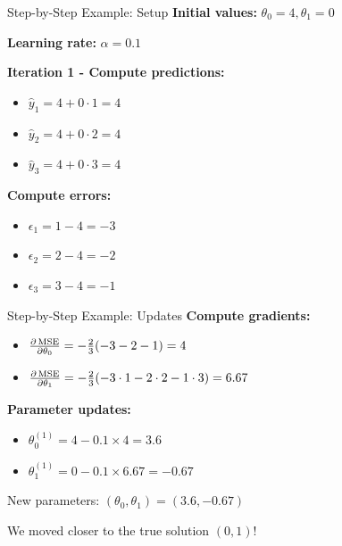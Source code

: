 \documentclass[usenames,dvipsnames]{beamer}
\begin{document}
  \begin{frame}{Step-by-Step Example: Setup}
    \textbf{Initial values:} $\theta_0 = 4, \theta_1 = 0$
    
    \textbf{Learning rate:} $\alpha = 0.1$
    
    \pause
    \textbf{Iteration 1 - Compute predictions:}
    \begin{itemize}[<+->]
        \item $\hat{y}_1 = 4 + 0 \cdot 1 = 4$
        \item $\hat{y}_2 = 4 + 0 \cdot 2 = 4$ 
        \item $\hat{y}_3 = 4 + 0 \cdot 3 = 4$
    \end{itemize}
    
    \pause
    \textbf{Compute errors:}
    \begin{itemize}[<+->]
        \item $\epsilon_1 = 1 - 4 = -3$
        \item $\epsilon_2 = 2 - 4 = -2$
        \item $\epsilon_3 = 3 - 4 = -1$
    \end{itemize}
  \end{frame}

  \begin{frame}{Step-by-Step Example: Updates}
    \textbf{Compute gradients:}
    \begin{itemize}[<+->]
        \item $\frac{\partial \operatorname{MSE}}{\partial \theta_0} = -\frac{2}{3}(-3-2-1) = 4$
        \item $\frac{\partial \operatorname{MSE}}{\partial \theta_1} = -\frac{2}{3}(-3 \cdot 1 - 2 \cdot 2 - 1 \cdot 3) = 6.67$
    \end{itemize}
    
    \pause
    \textbf{Parameter updates:}
    \begin{itemize}[<+->]
        \item $\theta_0^{(1)} = 4 - 0.1 \times 4 = 3.6$
        \item $\theta_1^{(1)} = 0 - 0.1 \times 6.67 = -0.67$
    \end{itemize}
    
    \pause
    \begin{keypointsbox}
    New parameters: $(\theta_0, \theta_1) = (3.6, -0.67)$
    
    We moved closer to the true solution $(0, 1)$!
    \end{keypointsbox}
  \end{frame}
\end{document}
